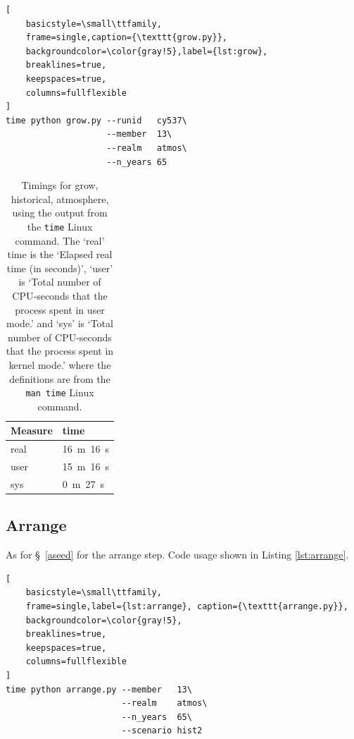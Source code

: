 \documentclass[11pt,a4paper]{article}
\begin{document}
\begin{center}
\begin{minipage}{\textwidth}
\begin{lstlisting}[
    basicstyle=\small\ttfamily,
    frame=single,caption={\texttt{grow.py}},
    backgroundcolor=\color{gray!5},label={lst:grow},
    breaklines=true,
    keepspaces=true,
    columns=fullflexible
]
time python grow.py --runid   cy537\ 
                    --member  13\
                    --realm   atmos\
                    --n_years 65
\end{lstlisting}
\end{minipage}
\end{center}

\begin{table}[h]
    \centering
    \caption{Timings for grow, historical, atmosphere, using the output from the \texttt{time} Linux command. The `real' time is the `Elapsed real time (in seconds)', `user' is `Total number of CPU-seconds that the process spent in user mode.' and `sys' is `Total number of CPU-seconds that the process spent in kernel mode.' where the definitions are from the \texttt{man time} Linux command.}
    \label{tab:growtable}
    \begin{tabular}{l l}
        \hline
        Measure & time  \\
        \hline
         real   & 16~m~16~s  \\
        user   & 15~m~16~s  \\
        sys     &  0~m~27~s  \\ 
        \hline
    \end{tabular}
\end{table}







\subsection{Arrange}

As for \S~\ref{aseed} for the arrange step. Code usage shown in Listing \ref{lst:arrange}.

\begin{center}
\begin{minipage}{\textwidth}
\begin{lstlisting}[
    basicstyle=\small\ttfamily,
    frame=single,label={lst:arrange}, caption={\texttt{arrange.py}},
    backgroundcolor=\color{gray!5},
    breaklines=true,
    keepspaces=true,
    columns=fullflexible
]
time python arrange.py --member   13\
                       --realm    atmos\
                       --n_years  65\
                       --scenario hist2
\end{lstlisting}
\end{minipage}
\end{center}
\end{document}
